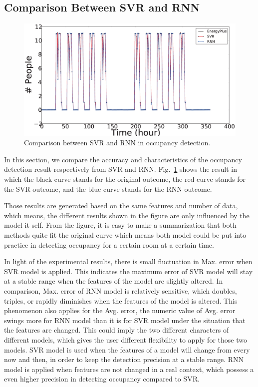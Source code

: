 \subsection{Comparison Between SVR and RNN}
\begin{figure}[!h]
\centering
\includegraphics[width=5in]{./Pics/comparison.eps}
\caption{Comparison between SVR and RNN in occupancy detection.}
\label{fig:comparison}
\end{figure}

In this section, we compare the accuracy and characteristics of the occupancy detection result respectively from SVR and RNN.
Fig.~\ref{fig:comparison} shows the result in which the black curve stands for the original outcome, the red curve stands for the SVR outcome, and the blue curve stands for the RNN outcome.

Those results are generated based on the same features and number of data, which means, the different results shown in the figure are only influenced by the model it self. From the figure, it is easy to make a summarization that both methods quite fit the original curve which means both model could be put into practice in detecting occupancy for a certain room at a certain time.

In light of the experimental results, there is small fluctuation in Max. error when SVR model is applied. This indicates the maximum error of SVR model will stay at a stable range when the features of the model are slightly altered. In comparison, Max. error of RNN model is relatively sensitive, which doubles, triples, or rapidly diminishes when the features of the model is altered. This phenomenon also applies for the Avg. error, the numeric value of Avg. error swings more for RNN model than it is for SVR model under the situation that the features are changed. This could imply the two different characters of different models, which gives the user different flexibility to apply for those two models. SVR model is used when the features of a model will change from every now and then, in order to keep the detection precision at a stable range. RNN model is applied when features are not changed in a real context, which possess a even higher precision in detecting occupancy compared to SVR.


